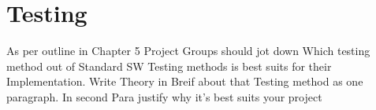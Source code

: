 \chapter{Testing}

As per outline in Chapter 5 Project Groups should jot down Which testing method out of Standard SW Testing methods is best suits for their Implementation. Write Theory in Breif about that Testing method as one paragraph. In second Para justify why it's best suits your project\\

